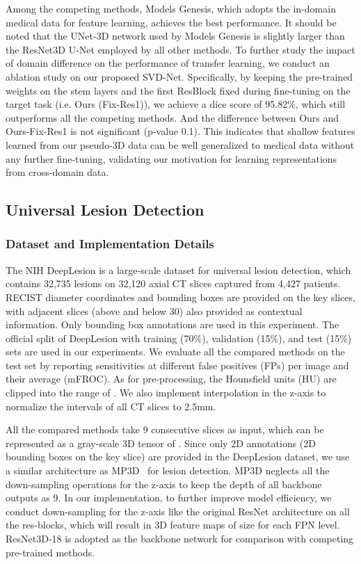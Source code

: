 \documentclass[journal,twoside,web]{ieeecolor}
\begin{document}
Among the competing methods, Models Genesis, which adopts the in-domain medical data for feature learning, achieves the best performance. 
It should be noted that the UNet-3D network used by Models Genesis is slightly larger than the ResNet3D U-Net employed by all other methods.
To further study the impact of domain difference on the performance of transfer learning, we conduct an ablation study on our proposed SVD-Net. 
Specifically, by keeping the pre-trained weights on the stem layers and the first ResBlock fixed during fine-tuning on the target task (i.e. Ours (Fix-Res1)), we achieve a dice score of 95.82\%, which still outperforms all the competing methods. And the difference between Ours and Ours-Fix-Res1 is not significant (p-value  0.1). 
This indicates that shallow features learned from our pseudo-3D data can be well generalized to medical data without any further fine-tuning, validating our motivation for learning representations from cross-domain data. 



\subsection{Universal Lesion Detection}

\subsubsection{Dataset and Implementation Details}

The NIH DeepLesion is a large-scale dataset for universal lesion detection, which contains 32,735 lesions on 32,120 axial CT slices captured from 4,427 patients. RECIST diameter coordinates and bounding boxes are provided on the key slices, with adjacent slices (above and below 30) also provided as contextual information. Only bounding box annotations are used in this experiment. The official split of DeepLesion with training (70\%), validation (15\%), and test (15\%) sets are used in our experiments. We evaluate all the compared methods on the test set by reporting sensitivities at different false positives (FPs) per image and their average (mFROC). As for pre-processing, the Hounsfield units (HU) are clipped into the range of . We also implement interpolation in the z-axis to normalize the intervals of all CT slices to 2.5mm.


All the compared methods take 9 consecutive slices as input, which can be represented as a gray-scale 3D tensor of . Since only 2D annotations (2D bounding boxes on the key slice) are provided in the DeepLesion dataset, we use a similar architecture as MP3D~\cite{zhang2020revisiting} for lesion detection. MP3D neglects all the down-sampling operations for the z-axis to keep the depth of all backbone outputs as 9. In our implementation, to further improve model efficiency, we conduct down-sampling for the z-axis like the original ResNet architecture on all the res-blocks, which will result in 3D feature maps of size  for each FPN level. ResNet3D-18 is adopted as the backbone network for comparison with competing pre-trained methods. 
\end{document}
